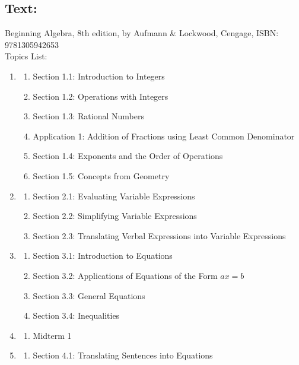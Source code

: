 \documentclass{ximera}
\begin{document}
\subsection*{Text:}
Beginning Algebra, 8th edition, by Aufmann \& Lockwood, Cengage, ISBN: 9781305942653\\
Topics List:\\
\begin{enumerate}
    \item
    \begin{enumerate}
        \item Section 1.1: Introduction to Integers
        \item Section 1.2: Operations with Integers
        \item Section 1.3: Rational Numbers
        \item Application 1: Addition of Fractions using Least Common Denominator
        \item Section 1.4: Exponents and the Order of Operations
        \item Section 1.5: Concepts from Geometry
    \end{enumerate}
    \item 
    \begin{enumerate}
        \item Section 2.1: Evaluating Variable Expressions
        \item Section 2.2: Simplifying Variable Expressions
        \item Section 2.3: Translating Verbal Expressions into Variable Expressions
    \end{enumerate}
    \item 
    \begin{enumerate}
        \item Section 3.1: Introduction to Equations
        \item Section 3.2: Applications of Equations of the Form $a x=b$
        \item Section 3.3: General Equations
        \item Section 3.4: Inequalities
    \end{enumerate}
    \item
    \begin{enumerate}
        \item Midterm 1
    \end{enumerate}  
    \item
    \begin{enumerate}
        \item Section 4.1: Translating Sentences into Equations

\end{enumerate}
\end{enumerate}
\end{document}
